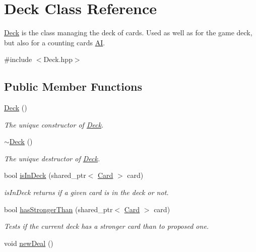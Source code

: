 \hypertarget{classDeck}{\section{\-Deck \-Class \-Reference}
\label{classDeck}
}


\hyperlink{classDeck}{\-Deck} is the class managing the deck of cards. \-Used as well as for the game deck, but also for a counting cards \hyperlink{classAI}{\-A\-I}.  




{\ttfamily \#include $<$\-Deck.\-hpp$>$}

\subsection*{\-Public \-Member \-Functions}
\begin{DoxyCompactItemize}
\item 
\hypertarget{classDeck_a57ae1cb4ac6fd61c249cefb2db85eb99}{\hyperlink{classDeck_a57ae1cb4ac6fd61c249cefb2db85eb99}{\-Deck} ()}\label{classDeck_a57ae1cb4ac6fd61c249cefb2db85eb99}

\begin{DoxyCompactList}\small\item\em \-The unique constructor of \hyperlink{classDeck}{\-Deck}. \end{DoxyCompactList}\item 
\hypertarget{classDeck_a7d1331cc558c302fdf44e5ae8aae1a95}{\hyperlink{classDeck_a7d1331cc558c302fdf44e5ae8aae1a95}{$\sim$\-Deck} ()}\label{classDeck_a7d1331cc558c302fdf44e5ae8aae1a95}

\begin{DoxyCompactList}\small\item\em \-The unique destructor of \hyperlink{classDeck}{\-Deck}. \end{DoxyCompactList}\item 
bool \hyperlink{classDeck_a12b3398e1ca7fdddfd9c5bb522714d8d}{is\-In\-Deck} (shared\-\_\-ptr$<$ \hyperlink{classCard}{\-Card} $>$ card)
\begin{DoxyCompactList}\small\item\em is\-In\-Deck returns if a given card is in the deck or not. \end{DoxyCompactList}\item 
bool \hyperlink{classDeck_a461b90e5916192e2b361f953748358ce}{has\-Stronger\-Than} (shared\-\_\-ptr$<$ \hyperlink{classCard}{\-Card} $>$ card)
\begin{DoxyCompactList}\small\item\em \-Tests if the current deck has a stronger card than to proposed one. \end{DoxyCompactList}\item 
\hypertarget{classDeck_aec4d8d2a67f1c46a1a7f175b8848f5b6}{void \hyperlink{classDeck_aec4d8d2a67f1c46a1a7f175b8848f5b6}{new\-Deal} ()}\label{classDeck_aec4d8d2a67f1c46a1a7f175b8848f5b6}


\end{DoxyCompactItemize}
